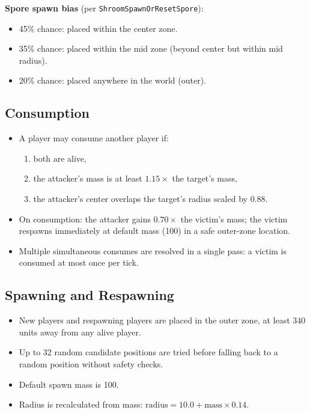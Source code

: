 \documentclass[11pt]{article}
\begin{document}
\noindent\textbf{Spore spawn bias} (per \texttt{ShroomSpawnOrResetSpore}):
\begin{itemize}
  \item 45\% chance: placed within the center zone.
  \item 35\% chance: placed within the mid zone (beyond center but within mid radius).
  \item 20\% chance: placed anywhere in the world (outer).
\end{itemize}

\subsection{Consumption}

\begin{itemize}
  \item A player may consume another player if:
    \begin{enumerate}
      \item both are alive,
      \item the attacker's mass is at least $1.15 \times$ the target's mass,
      \item the attacker's center overlaps the target's radius scaled by $0.88$.
    \end{enumerate}
  \item On consumption: the attacker gains $0.70 \times$ the victim's mass; the victim respawns immediately at default mass (100) in a safe outer-zone location.
  \item Multiple simultaneous consumes are resolved in a single pass: a victim is consumed at most once per tick.
\end{itemize}

\subsection{Spawning and Respawning}

\begin{itemize}
  \item New players and respawning players are placed in the outer zone, at least 340 units away from any alive player.
  \item Up to 32 random candidate positions are tried before falling back to a random position without safety checks.
  \item Default spawn mass is 100.
  \item Radius is recalculated from mass: $\text{radius} = 10.0 + \text{mass} \times 0.14$.
\end{itemize}
\end{document}

